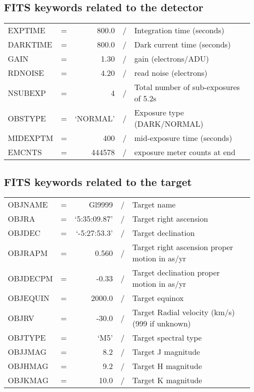 \vspace{0.5cm}
\subsection{FITS keywords related to the detector}

\begin{table}[H]
\begin{tabular}{lcrcl}
EXPTIME & = &                800.0 & / &  Integration time (seconds) \\
DARKTIME& = &            800.0 & / & Dark current time (seconds) \\
GAIN    & = &                 1.30 & / & gain (electrons/ADU) \\
RDNOISE & = &                 4.20 & / & read noise (electrons) \\
NSUBEXP & = &                    4 & / & Total number of sub-exposures of 5.2s \\
OBSTYPE & = &   `NORMAL'     & / & Exposure type (DARK/NORMAL) \\
MIDEXPTM& = &        400  & / &  mid-exposure time (seconds)  \\
EMCNTS  & = & 	444578   & / & exposure meter counts at end \\
\end{tabular}
\end{table}

\vspace{0.5cm}
\subsection{FITS keywords related to the target}
\begin{table}[H]
\begin{tabular}{lcrcl}
OBJNAME & = &  Gl9999   & / &  Target name \\
OBJRA   & = &  `5:35:09.87'         & / & Target right ascension \\
OBJDEC  & = &  `-5:27:53.3'        & / & Target declination \\
OBJRAPM & = &                  0.560 & / & Target right ascension proper motion in as/yr \\
OBJDECPM& = &                  -0.33 & / & Target declination proper motion in as/yr \\
OBJEQUIN& = &  2000.0       & / & Target equinox \\

OBJRV   & = &        -30.0      & / & Target Radial velocity (km/s)  (999 if unknown) \\
OBJTYPE & = &     `M5' & / & Target spectral type \\
OBJJMAG & = &        8.2 & / & Target J magnitude \\
OBJHMAG & = &        9.2 & / & Target H magnitude \\
OBJKMAG & = &        10.0 & / & Target K magnitude  \\
\end{tabular}
\end{table}
\vspace{0.5cm}
